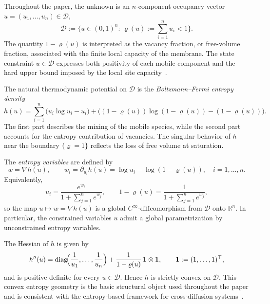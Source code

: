\documentclass{article}
\newcommand{\R}{\mathbb{R}}
\newcommand{\bone}{\mathbf{1}}
\newcommand{\D}{\mathcal{D}}
\begin{document}
Throughout the paper, the unknown is an $n$-component occupancy vector
$u = (u_1,\dots,u_n) \in \D$,
\begin{equation}\label{eq:D}
  \D := \bigl\{u \in (0,1)^n :\, \varrho(u) := \textstyle\sum_{i=1}^n u_i < 1\bigr\}.
\end{equation}
The quantity $1-\varrho(u)$ is interpreted as the vacancy fraction, or
free-volume fraction, associated with the finite local capacity of the
membrane. The state constraint $u\in\D$ expresses both positivity of
each mobile component and the hard upper bound imposed by the local site
capacity~\cite{Krishna1997,Giovangigli1999,BoetheDreyer2015}.

The natural thermodynamic potential on $\D$ is the
\emph{Boltzmann--Fermi entropy density}
\begin{equation}\label{eq:h}
  h(u) = \sum_{i=1}^n \bigl(u_i\log u_i - u_i\bigr)
        + \bigl((1-\varrho(u))\log(1-\varrho(u)) - (1-\varrho(u))\bigr).
\end{equation}
The first part describes the mixing of the mobile species, while the
second part accounts for the entropy contribution of vacancies. The
singular behavior of $h$ near the boundary $\{\varrho=1\}$ reflects
the loss of free volume at saturation.

The \emph{entropy variables} are defined by
\begin{equation}\label{eq:w}
  w = \nabla h(u), \qquad
  w_i = \partial_{u_i}h(u) = \log u_i - \log(1-\varrho(u)),
  \quad i=1,\dots,n.
\end{equation}
Equivalently,
\[
  u_i = \frac{e^{w_i}}{1+\sum_{j=1}^n e^{w_j}},
  \qquad
  1-\varrho(u) = \frac{1}{1+\sum_{j=1}^n e^{w_j}},
\]
so the map $u\mapsto w = \nabla h(u)$ is a global $C^\infty$-diffeomorphism
from $\D$ onto $\R^n$. In particular, the constrained variables $u$ admit
a global parametrization by unconstrained entropy variables.

The Hessian of $h$ is given by
\begin{equation}\label{eq:hess}
  h''(u) = \operatorname{diag}\!\Bigl(\frac{1}{u_1},\dots,\frac{1}{u_n}\Bigr)
          + \frac{1}{1-\varrho(u)}\,\bone\otimes\bone,
  \qquad \bone := (1,\dots,1)^\top,
\end{equation}
and is positive definite for every $u\in\D$. Hence $h$ is strictly convex
on $\D$. This convex entropy geometry is the basic structural object used
throughout the paper and is consistent with the entropy-based framework
for cross-diffusion systems~\cite{Jungel2015,JungelStelzer2013}.
\end{document}
